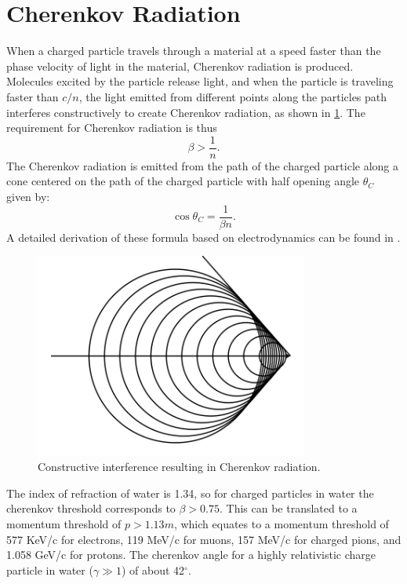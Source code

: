 \section{Cherenkov Radiation}
\label{ch:cherenkov_radtion}
When a charged particle travels through a material at a speed faster than the phase velocity of light in the material, Cherenkov radiation is produced.  Molecules excited by the particle release light, and when the particle is traveling faster than $c/n$, the light emitted from different points along the particles path interferes constructively to create Cherenkov radiation, as shown in \cref{fig:cherenkovradiation}.  The requirement for Cherenkov radiation is thus
\begin{equation}
\beta>\frac{1}{n}.
\label{eq:cherenkov_req}
\end{equation}
The Cherenkov radiation is emitted from the path of the charged particle along a cone centered on the path of the charged particle with half opening angle $\theta_C$ given by:
\begin{equation}
\cos \theta_C=\frac{1}{\beta n}.
\label{eq:cherenkov_angle}
\end{equation}
A detailed derivation of these formula based on electrodynamics can be found in \cite{Jackson:1998nia}.
\begin{figure}
\centering
\includegraphics[width=0.8\textwidth]{figures/Cherenkov_radiation.png}
\caption{Constructive interference resulting in Cherenkov radiation.}
\label{fig:cherenkovradiation}
\end{figure}
The index of refraction of water is 1.34, so for charged particles in water the cherenkov threshold corresponds to $\beta>0.75$.  This can be translated to a momentum threshold of $p>1.13m$, which equates to a momentum threshold of 577 KeV/c for electrons, 119 MeV/c for muons, 157 MeV/c for charged pions, and 1.058 GeV/c for protons.  The cherenkov angle for a highly relativistic charge particle in water ($\gamma \gg 1$) of about 42$^\circ$.  \par
